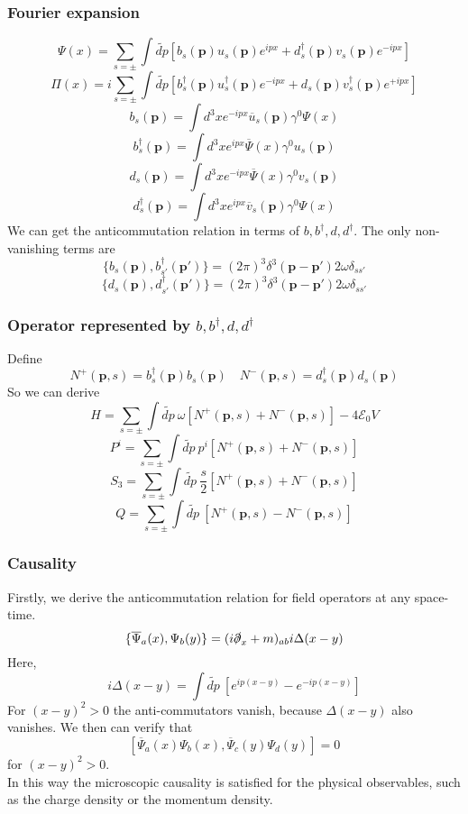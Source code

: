 \documentclass[cyan]{elegantnote}
\begin{document}
\subsubsection{Fourier expansion}
\[\Psi(x) = \sum_{s = \pm} \int \widetilde{dp} \left[ b_s(\bm{p})u_s(\bm{p}) e^{ipx} + d^{\dagger}_s(\bm{p})v_s(\bm{p}) e^{-ipx}\right]\]
\[\Pi(x) = i\sum_{s = \pm} \int \widetilde{dp} \left[ b^{\dagger}_s(\bm{p})u^{\dagger}_s(\bm{p}) e^{-ipx} + d_s(\bm{p})v^{\dagger}_s(\bm{p}) e^{+ipx}\right]\]
\[b_s(\bm{p}) = \int d^3x e^{-ipx} \overline{u}_s(\bm{p}) \gamma^0 \Psi(x)\]
\[b^{\dagger}_s(\bm{p}) = \int d^3x e^{ipx} \overline{\Psi}(x) \gamma^0 u_s(\bm{p})\]
\[d_s(\bm{p}) = \int d^3x e^{-ipx} \overline{\Psi}(x) \gamma^0 v_s(\bm{p})\]
\[d^{\dagger}_s(\bm{p}) = \int d^3x e^{ipx} \overline{v}_s(\bm{p}) \gamma^0 \Psi(x)\]
We can get the anticommutation relation in terms of $b,b^{\dagger},d,d^{\dagger}$. The only non-vanishing terms are
\[\{b_s(\bm{p}),b^{\dagger}_{s'}(\bm{p}')\} = (2\pi)^3 \delta^3(\bm{p}-\bm{p}')2\omega \delta_{ss'}\]
\[\{d_s(\bm{p}),d^{\dagger}_{s'}(\bm{p}')\} = (2\pi)^3 \delta^3(\bm{p}-\bm{p}')2\omega \delta_{ss'}\]

\subsubsection{Operator represented by $b,b^{\dagger},d,d^{\dagger}$}
\noindent
Define
\[N^{+}(\bm{p},s) = b^{\dagger}_s(\bm{p}) b_s(\bm{p}) \quad N^{-}(\bm{p},s) = d^{\dagger}_s(\bm{p}) d_s(\bm{p})\]
So we can derive
\[ H = \sum_{s=\pm} \int \widetilde{dp} \: \omega \left[ N^{+}(\bm{p},s) + N^{-}(\bm{p},s)\right] - 4\mathcal{E}_0V\]
\[ P^i = \sum_{s=\pm} \int \widetilde{dp} \: p^i \left[ N^{+}(\bm{p},s) + N^{-}(\bm{p},s)\right] \]
\[S_3 = \sum_{s=\pm} \int \widetilde{dp} \: \frac{s}{2} \left[ N^{+}(\bm{p},s) + N^{-}(\bm{p},s)\right]\]
\[Q = \sum_{s=\pm} \int \widetilde{dp} \: \left[ N^{+}(\bm{p},s) - N^{-}(\bm{p},s)\right]\]

\subsubsection{Causality}
\noindent
Firstly, we derive the anticommutation relation for field operators at any space-time.
\[\{\overline{\Psi}_{a}(x),\Psi_{b}(y)\} = (i\slashed{\partial}_x + m)_{ab} i\Delta(x-y)\]
Here,
\[i\Delta(x-y) = \int \widetilde{dp} \: [e^{ip(x-y)} - e^{-ip(x-y)}]\]
For $(x-y)^2 > 0$ the anti-commutators vanish, because $\Delta(x-y)$ also vanishes. 
We then can verify that
\[[\overline{\Psi}_{a}(x)\Psi_{b}(x),\overline{\Psi}_{c}(y)\Psi_{d}(y)] = 0\]
for $(x-y)^2 > 0$.\\
In this way the microscopic causality is satisfied for the physical observables, such as the charge density or the momentum density.
\end{document}
